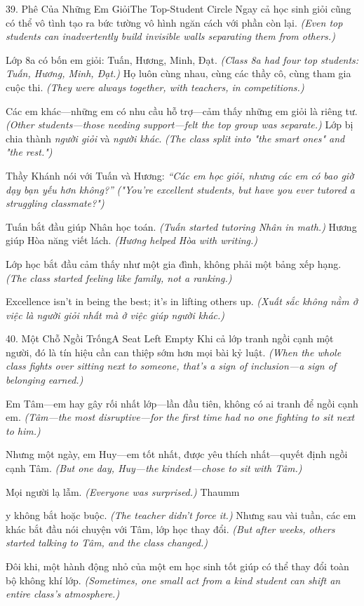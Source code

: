 \begin{truyen}{39. Phê Của Những Em Giỏi}{The Top-Student Circle}
Ngay cả học sinh giỏi cũng có thể vô tình tạo ra bức tường vô hình ngăn cách với phần còn lại.
\textit{(Even top students can inadvertently build invisible walls separating them from others.)}

Lớp 8a có bốn em giỏi: Tuấn, Hương, Minh, Đạt.
\textit{(Class 8a had four top students: Tuấn, Hương, Minh, Đạt.)}
Họ luôn cùng nhau, cùng các thầy cô, cùng tham gia cuộc thi.
\textit{(They were always together, with teachers, in competitions.)}

Các em khác—những em có nhu cầu hỗ trợ—cảm thấy những em giỏi là riêng tư.
\textit{(Other students—those needing support—felt the top group was separate.)}
Lớp bị chia thành \textit{người giỏi} và \textit{người khác}.
\textit{(The class split into "the smart ones" and "the rest.")}

Thầy Khánh nói với Tuấn và Hương: \textit{``Các em học giỏi, nhưng các em có bao giờ dạy bạn yếu hơn không?''}
\textit{("You're excellent students, but have you ever tutored a struggling classmate?")}

Tuấn bắt đầu giúp Nhân học toán.
\textit{(Tuấn started tutoring Nhân in math.)}
Hương giúp Hòa năng viết lách.
\textit{(Hương helped Hòa with writing.)}

Lớp học bắt đầu cảm thấy như một gia đình, không phải một bảng xếp hạng.
\textit{(The class started feeling like family, not a ranking.)}
\end{truyen}

\begin{baihoc}
Excellence isn't in being the best; it's in lifting others up.
\textit{(Xuất sắc không nằm ở việc là người giỏi nhất mà ở việc giúp người khác.)}
\end{baihoc}

\begin{truyen}{40. Một Chỗ Ngồi Trống}{A Seat Left Empty}
Khi cả lớp tranh ngồi cạnh một người, đó là tín hiệu cần can thiệp sớm hơn mọi bài kỷ luật.
\textit{(When the whole class fights over sitting next to someone, that's a sign of inclusion—a sign of belonging earned.)}

Em Tâm—em hay gây rối nhất lớp—lần đầu tiên, không có ai tranh để ngồi cạnh em.
\textit{(Tâm—the most disruptive—for the first time had no one fighting to sit next to him.)}

Nhưng một ngày, em Huy—em tốt nhất, được yêu thích nhất—quyết định ngồi cạnh Tâm.
\textit{(But one day, Huy—the kindest—chose to sit with Tâm.)}

Mọi người lạ lẫm.
\textit{(Everyone was surprised.)}
Thaumm

y không bắt hoặc buộc.
\textit{(The teacher didn't force it.)}
Nhưng sau vài tuần, các em khác bắt đầu nói chuyện với Tâm, lớp học thay đổi.
\textit{(But after weeks, others started talking to Tâm, and the class changed.)}

Đôi khi, một hành động nhỏ của một em học sinh tốt giúp có thể thay đổi toàn bộ không khí lớp.
\textit{(Sometimes, one small act from a kind student can shift an entire class's atmosphere.)}
\end{truyen}

